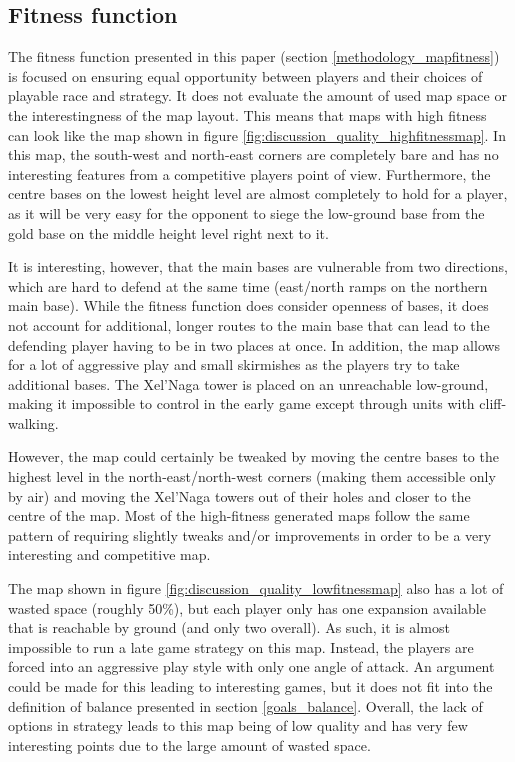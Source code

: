 \subsection{Fitness function}
\label{discussion_quality_fitnessfunction}
The fitness function presented in this paper (section \ref{methodology_mapfitness}) is focused on ensuring equal opportunity between players and their choices of playable race and strategy. It does not evaluate the amount of used map space or the interestingness of the map layout. This means that maps with high fitness can look like the map shown in figure \ref{fig:discussion_quality_highfitnessmap}. In this map, the south-west and north-east corners are completely bare and has no interesting features from a competitive players point of view. Furthermore, the centre bases on the lowest height level are almost completely to hold for a player, as it will be very easy for the opponent to siege the low-ground base from the gold base on the middle height level right next to it.

It is interesting, however, that the main bases are vulnerable from two directions, which are hard to defend at the same time (east/north ramps on the northern main base). While the fitness function does consider openness of bases, it does not account for additional, longer routes to the main base that can lead to the defending player having to be in two places at once. In addition, the map allows for a lot of aggressive play and small skirmishes as the players try to take additional bases. The Xel'Naga tower is placed on an unreachable low-ground, making it impossible to control in the early game except through units with cliff-walking.

However, the map could certainly be tweaked by moving the centre bases to the highest level in the north-east/north-west corners (making them accessible only by air) and moving the Xel'Naga towers out of their holes and closer to the centre of the map. Most of the high-fitness generated maps follow the same pattern of requiring slightly tweaks and/or improvements in order to be a very interesting and competitive map.


The map shown in figure \ref{fig:discussion_quality_lowfitnessmap} also has a lot of wasted space (roughly 50\%), but each player only has one expansion available that is reachable by ground (and only two overall). As such, it is almost impossible to run a late game strategy on this map. Instead, the players are forced into an aggressive play style with only one angle of attack. An argument could be made for this leading to interesting games, but it does not fit into the definition of balance presented in section \ref{goals_balance}. Overall, the lack of options in strategy leads to this map being of low quality and has very few interesting points due to the large amount of wasted space.

